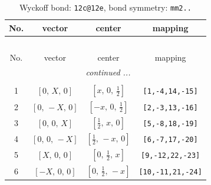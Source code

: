 \documentclass[fleqn,8pt]{jsarticle}
\begin{document}
\begin{longtable}{cccc}
\caption{Wyckoff bond: {\tt 12c@12e}, bond symmetry: {\tt mm2..}}
 \\
 \hline \hline
No. & vector & center & mapping \\ \hline \endfirsthead

\multicolumn{3}{l}{\tablename\ \thetable{}} \\
 \hline \hline
No. & vector & center & mapping \\ \hline \endhead

 \hline \hline
\multicolumn{3}{r}{\footnotesize\it continued ...} \\ \endfoot

 \hline \hline
\multicolumn{3}{r}{} \\ \endlastfoot

1 & $\left[ 0,\, X,\, 0 \right]$ & $\left[ x,\, 0,\, \frac{1}{2} \right]$ & {\tt [1,-4,14,-15]} \\ \hline
2 & $\left[ 0,\, - X,\, 0 \right]$ & $\left[ - x,\, 0,\, \frac{1}{2} \right]$ & {\tt [2,-3,13,-16]} \\ \hline
3 & $\left[ 0,\, 0,\, X \right]$ & $\left[ \frac{1}{2},\, x,\, 0 \right]$ & {\tt [5,-8,18,-19]} \\ \hline
4 & $\left[ 0,\, 0,\, - X \right]$ & $\left[ \frac{1}{2},\, - x,\, 0 \right]$ & {\tt [6,-7,17,-20]} \\ \hline
5 & $\left[ X,\, 0,\, 0 \right]$ & $\left[ 0,\, \frac{1}{2},\, x \right]$ & {\tt [9,-12,22,-23]} \\ \hline
6 & $\left[ - X,\, 0,\, 0 \right]$ & $\left[ 0,\, \frac{1}{2},\, - x \right]$ & {\tt [10,-11,21,-24]} \\
\end{longtable}
\renewcommand{\arraystretch}{1.2}
\end{document}
